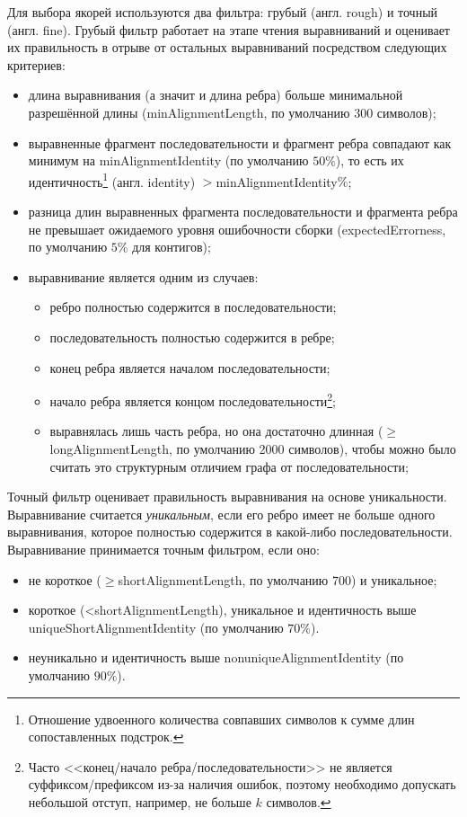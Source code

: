 \documentclass[14pt]{matmex-diploma-custom}
\begin{document}
Для выбора якорей используются два фильтра: грубый (англ. rough) и точный (англ. fine). Грубый фильтр работает на этапе чтения выравниваний и оценивает их правильность в отрыве от остальных выравниваний посредством следующих критериев:
\begin{itemize}
    \item длина выравнивания (а значит и длина ребра) больше минимальной разрешённой длины (minAlignmentLength, по умолчанию $300$ символов);
    \item выравненные фрагмент последовательности и фрагмент ребра совпадают как минимум на minAlignmentIdentity (по умолчанию $50\%$), то есть их идентичность\footnote{Отношение удвоенного количества совпавших символов к сумме длин сопоставленных подстрок.} (англ. identity) $> $minAlignmentIdentity$\%$;
    \item разница длин выравненных фрагмента последовательности и фрагмента ребра не превышает ожидаемого уровня ошибочности сборки (expectedErrorness, по умолчанию $5\%$ для контигов);
    \item выравнивание является одним из случаев:
    \begin{itemize}
        \item ребро полностью содержится в последовательности;
        \item последовательность полностью содержится в ребре;
        \item конец ребра является началом последовательности;
        \item начало ребра является концом последовательности\footnote{Часто <<конец/начало ребра/последовательности>> не является суффиксом/префиксом из-за наличия ошибок, поэтому необходимо допускать небольшой отступ, например, не больше $k$ символов.};
        \item выравнялась лишь часть ребра, но она достаточно длинная ($\ge$ longAlignmentLength, по умолчанию 2000 символов), чтобы можно было считать это структурным отличием графа от последовательности;
    \end{itemize}
\end{itemize}

Точный фильтр оценивает правильность выравнивания на основе уникальности. Выравнивание считается \textit{уникальным}, если его ребро имеет не больше одного выравнивания, которое полностью содержится в какой-либо последовательности. Выравнивание принимается точным фильтром, если оно:
\begin{itemize}
    \item не короткое ($\ge$shortAlignmentLength, по умолчанию 700) и уникальное;
    \item короткое (<shortAlignmentLength), уникальное и идентичность выше uniqueShortAlignmentIdentity (по умолчанию $70\%$).
    \item неуникально и идентичность выше nonuniqueAlignmentIdentity (по умолчанию $90\%$).
\end{itemize}
\end{document}

